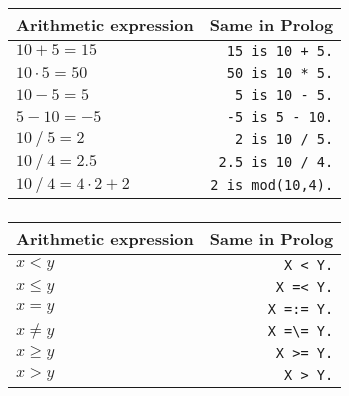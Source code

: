 \begin{frame}
	\frametitle{\insertsection}
	
	\begin{table}
		\centering
		\begin{tabular}{ l | r }
			\rowcolor{Gray}
			\textbf{Arithmetic expression} & \textbf{Same in Prolog} \\
			\hline
			\rowcolor{LightGray}\( 10 + 5 = 15 \) & \texttt{15 is 10 + 5.}   \\
			\rowcolor{LightGray}\( 10\cdot 5 = 50 \)  & \texttt{50 is 10 * 5.}   \\
			\rowcolor{LightGray}\( 10 - 5 = 5 \)  & \texttt{5 is 10 - 5.}   \\
			\rowcolor{LightGray}\( 5 - 10 = -5 \)  & \texttt{-5 is 5 - 10.}   \\
			\rowcolor{LightGray}\( 10~/~5 = 2 \)  & \texttt{2 is 10 / 5.}   \\
			\rowcolor{LightGray}\( 10~/~4 = 2.5 \)  & \texttt{2.5 is 10 / 4.}   \\
			\rowcolor{LightGray}\( 10~/~4 = 4\cdot 2 + 2 \)  & \texttt{2 is mod(10,4).}  \\
		\end{tabular}
	\end{table}
	
\end{frame}


\begin{frame}
	\frametitle{\insertsection}
	
	\begin{table}
		\centering
		\begin{tabular}{ l | r }
			\rowcolor{Gray}
			\textbf{Arithmetic expression}   & \textbf{Same in Prolog} \\
			\hline
			\rowcolor{LightGray}\( x < y \) & \texttt{X < Y.}  \\
			\rowcolor{LightGray}\( x\leqslant y \)  & \texttt{X =< Y.}   \\
			\rowcolor{LightGray}\( x = y \)  & \texttt{X =:= Y.}  \\
			\rowcolor{LightGray}\( x\neq y \)  & \texttt{X =\textbackslash = Y.}  \\
			\rowcolor{LightGray}\( x\geqslant y \)  & \texttt{X >= Y.}  \\
			\rowcolor{LightGray}\( x > y \)  & \texttt{X > Y.} \\
		\end{tabular}
	\end{table}
	
\end{frame}


